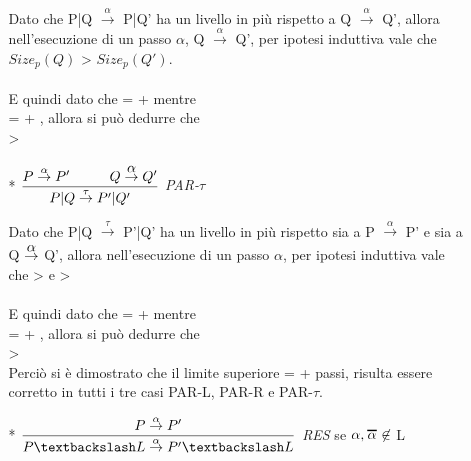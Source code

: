 \begin{itemize}
\begin{itemize}
			Dato che P|Q $\overset{\alpha}\rightarrow$ P|Q' ha un livello in più rispetto a Q $\overset{\alpha}\rightarrow$ Q', allora nell'esecuzione di un passo $\alpha$, Q $\overset{\alpha}\rightarrow$ Q', per ipotesi induttiva vale che $Size_{p}(Q)$ > $Size_{p}(Q')$.\\ \\
			E quindi dato che  =  +  mentre\\  =  + , allora si può dedurre che \\  > 
			\\
		\item[*]
			$\dfrac{P \overset{\alpha}\rightarrow P' \hspace{1cm} Q \overset{\Overline[0.01pt]{\alpha}}\rightarrow Q'}{P|Q \overset{\tau}\rightarrow P'|Q'}$ \textit{PAR-$\tau$}  
		
			Dato che P|Q $\overset{\tau}\rightarrow$ P'|Q' ha un livello in più rispetto sia a P $\overset{\alpha}\rightarrow$ P' e sia a Q $\overset{\Overline[0.01pt]{\alpha}}\rightarrow$ Q', allora nell'esecuzione di un passo $\alpha$, per ipotesi induttiva vale che  >  e  >  \\
			\\
			E quindi dato che  =  +  mentre\\  =  + , allora si può dedurre che \\  > 
			\\
			
		Perciò si è dimostrato che il limite superiore   = +  passi, risulta essere corretto in tutti i tre casi PAR-L, PAR-R e PAR-$\tau$.
		\\
		\item[*]
			$\dfrac{P \overset{\alpha}\rightarrow P'}{P \textbackslash L \overset{\alpha}\rightarrow P' \textbackslash L}$ \textit{RES} se $\alpha, \Overline[1pt]{\alpha} \not\in$ L
			

\end{itemize}
\end{itemize}
